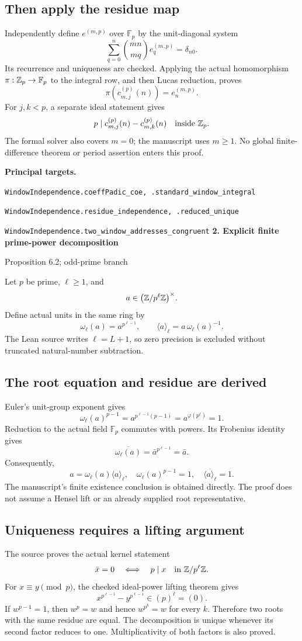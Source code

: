 \documentclass[11pt]{article}
\newcommand{\F}{\mathbb F}
\newcommand{\target}[1]{{\footnotesize\texttt{#1}}}
\newcommand{\pageheading}[2]{{\Large\bfseries\color{ink}#1}\par{\small #2}\par\medskip}
\begin{document}
\subsection*{Then apply the residue map}
Independently define $e^{(m,p)}$ over $\F_p$ by the unit-diagonal system
\[
 \sum_{q=0}^{n}\binom{mn}{mq}e^{(m,p)}_q=\delta_{n0}.
\]
Its recurrence and uniqueness are checked. Applying the actual homomorphism $\pi:\Z_p\to\F_p$ to the integral row, and then Lucas reduction, proves
\[
 \boxed{\pi(c^{(p)}_{m,j}(n))=e^{(m,p)}_n.}
\]
For $j,k<p$, a separate ideal statement gives
\[
 p\mid c^{(p)}_{m,j}(n)-c^{(p)}_{m,k}(n)\quad\text{inside }\mathbb Z_p.
\]
The formal solver also covers $m=0$; the manuscript uses $m\geq1$. No global finite-difference theorem or period assertion enters this proof.

\textbf{Principal targets.}\par
\target{WindowIndependence.coeffPadic\_coe, .standard\_window\_integral}\par
\target{WindowIndependence.residue\_independence, .reduced\_unique}\par
\target{WindowIndependence.two\_window\_addresses\_congruent}
\newpage
\pageheading{2. Explicit finite prime-power decomposition}{Proposition 6.2; odd-prime branch}
Let $p$ be prime, $\ell\geq1$, and
\[
 a\in\bigl(\mathbb Z/p^\ell\mathbb Z\bigr)^\times.
\]
Define actual units in the same ring by
\[
 \boxed{\omega_\ell(a)=a^{p^{\ell-1}},\qquad
 \langle a\rangle_\ell=a\,\omega_\ell(a)^{-1}.}
\]
The Lean source writes $\ell=L+1$, so zero precision is excluded without truncated natural-number subtraction.

\subsection*{The root equation and residue are derived}
Euler's unit-group exponent gives
\[
 \omega_\ell(a)^{p-1}
 =a^{p^{\ell-1}(p-1)}=a^{\varphi(p^\ell)}=1.
\]
Reduction to the actual field $\F_p$ commutes with powers. Its Frobenius identity gives
\[
 \overline{\omega_\ell(a)}
 =\bar a^{p^{\ell-1}}=\bar a.
\]
Consequently,
\[
 \boxed{a=\omega_\ell(a)\langle a\rangle_\ell,\quad
 \omega_\ell(a)^{p-1}=1,\quad
 \overline{\langle a\rangle_\ell}=1.}
\]
The manuscript's finite existence conclusion is obtained directly. The proof does not assume a Hensel lift or an already supplied root representative.

\subsection*{Uniqueness requires a lifting argument}
The source proves the actual kernel statement
\[
 \bar x=0\quad\Longleftrightarrow\quad p\mid x
 \quad\text{in }\mathbb Z/p^\ell\mathbb Z.
\]
For $x\equiv y\pmod p$, the checked ideal-power lifting theorem gives
\[
 x^{p^{\ell-1}}-y^{p^{\ell-1}}\in(p)^\ell=(0).
\]
If $w^{p-1}=1$, then $w^p=w$ and hence $w^{p^k}=w$ for every $k$. Therefore two roots with the same residue are equal. The decomposition is unique whenever its second factor reduces to one. Multiplicativity of both factors is also proved.
\end{document}
